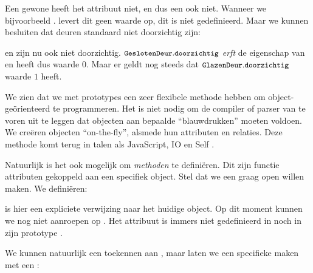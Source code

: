 Een gewone  heeft het attribuut  niet, en dus een  ook niet. Wanneer we bijvoorbeeld . levert dit geen waarde op, dit is niet gedefinieerd.
Maar we kunnen besluiten dat deuren standaard niet doorzichtig zijn:

\begin{codelines}
\end{codelines}

en zijn nu ook niet doorzichtig. $\text{\ttfamily\small\upshape GeslotenDeur}.\text{\ttfamily\small\upshape doorzichtig}$ \emph{erft} de eigenschap van  en heeft dus waarde $0$. Maar er geldt nog steeds dat $\text{\ttfamily\small\upshape GlazenDeur}.\text{\ttfamily\small\upshape doorzichtig}$ waarde $1$ heeft.

We zien dat we met prototypes een zeer flexibele methode hebben om object-geörienteerd te programmeren. Het is niet nodig om de compiler of parser van te voren uit te leggen dat objecten aan bepaalde “blauwdrukken” moeten voldoen. We creëren objecten “on-the-fly”, alsmede hun attributen en relaties. Deze methode komt terug in talen als JavaScript, IO en Self \citep{javascript,io,self}.

Natuurlijk is het ook mogelijk om \emph{methoden} te definiëren. Dit zijn functie attributen gekoppeld aan een specifiek object. Stel dat we een  graag open willen maken. We definiëren:

\begin{codelines}
  \codeLine{\IN \ELSE}
\end{codelines}

 is hier een expliciete verwijzing naar het huidige object. Op dit moment kunnen we  nog niet aanroepen op .
Het attribuut  is immers niet gedefinieerd in  noch in zijn prototype .

We kunnen natuurlijk een  toekennen aan , maar laten we een specifieke  maken met een :

\begin{codelines}
\end{codelines}

